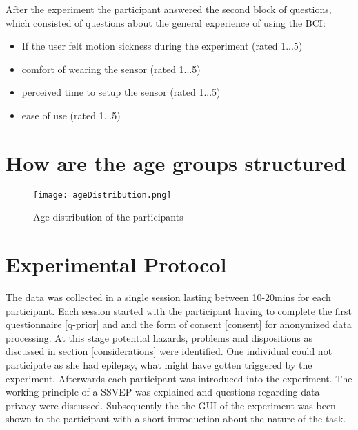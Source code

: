             After the experiment the participant answered the second block of questions, which consisted of questions about the general experience of using the BCI:
            
            \begin{itemize}
                \item If the user felt motion sickness during the experiment (rated 1...5)
                \item comfort of wearing the sensor (rated 1...5)
                \item perceived time to setup the sensor (rated 1...5)
                \item ease of use (rated 1...5) %
            \end{itemize}           

        \section{How are the age groups structured}


            \begin{figure}[h]     %
                \centering
                \texttt{[image: ageDistribution.png]} 
                \caption{Age distribution of the participants}\label{age-dist}
            \end{figure}  

        \section{Experimental Protocol}

            The data was collected in a single session lasting between 10-20mins for each participant. Each session started with the participant having to complete the first questionnaire \ref*{q-prior} and and the form of consent \ref*{consent} for anonymized data processing. At this stage potential hazards, problems and dispositions as discussed in section \ref{considerations} were identified. One individual could not participate as she had epilepsy, what might have gotten triggered by the experiment.
            Afterwards each participant was introduced into the experiment. The working principle of a SSVEP was explained and questions regarding data privacy were discussed. Subsequently the the GUI of the experiment was been shown to the participant with a short introduction about the nature of the task.

